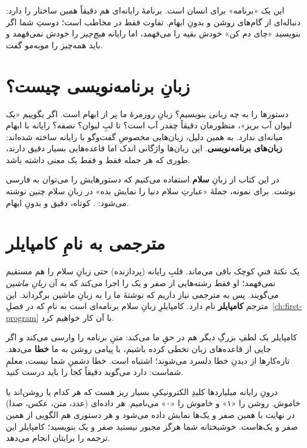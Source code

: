 این یک «برنامه» برای انسان است. برنامهٔ رایانه‌ای هم دقیقاً همین ساختار را
دارد: دنباله‌ای از گام‌های روشن و بدونِ ابهام. تفاوت فقط در مخاطب است؛
دوستِ شما اگر بنویسید «چای دم کن» خودش بقیه را می‌فهمد، اما رایانه
\emph{هیچ‌چیز} را خودش نمی‌فهمد و باید همه‌چیز را مو‌به‌مو گفت.

\section{زبانِ برنامه‌نویسی چیست؟}

دستورها را به چه زبانی بنویسیم؟ زبانِ روزمرهٔ ما پر از ابهام است. اگر بگوییم
«یک لیوان آب بریز»، منظورمان دقیقاً چقدر آب است؟ تا لبِ لیوان؟ نصفه؟ رایانه
با ابهام میانه‌ای ندارد. به همین دلیل، زبان‌هایی مخصوصِ گفت‌وگو با رایانه
ساخته شده‌اند: \textbf{زبان‌های برنامه‌نویسی}. این زبان‌ها واژگانی اندک اما
قاعده‌هایی بسیار دقیق دارند، طوری که هر جمله فقط و فقط یک معنی داشته باشد.

در این کتاب از زبانِ \textbf{سلام} استفاده می‌کنیم که دستورهایش را می‌توان به
فارسی نوشت. برای نمونه، جملهٔ «عبارتِ سلام دنیا را نمایش بده» در زبانِ سلام
چنین نوشته می‌شود: . کوتاه، دقیق و بدونِ ابهام.

\section{مترجمی به نامِ کامپایلر}

یک نکتهٔ فنیِ کوچک باقی می‌ماند. قلبِ رایانه (پردازنده) حتی زبانِ سلام را هم
مستقیم نمی‌فهمد؛ او فقط رشته‌هایی از صفر و یک را اجرا می‌کند که به آن
\emph{زبانِ ماشین} می‌گویند. پس به مترجمی نیاز داریم که نوشتهٔ ما را به زبانِ
ماشین برگرداند. این مترجم \textbf{کامپایلر} نام دارد. کامپایلرِ زبانِ سلام
برنامه‌ای است به نامِ  که در فصلِ~\ref{ch:first-program} با آن
کار خواهیم کرد.

کامپایلر یک لطفِ بزرگِ دیگر هم در حقِ ما می‌کند: متنِ برنامه را وارسی
می‌کند و اگر جایی از قاعده‌های زبان تخطی کرده باشیم، با پیامی روشن به ما
\textbf{خطا} می‌دهد. تازه‌کارها از دیدنِ خطا دلسرد می‌شوند؛ اشتباه است.
خطا دشمنِ شما نیست، معلمِ شماست: دارد می‌گوید دقیقاً کجا را باید درست کنید.

\begin{deep}
درونِ رایانه میلیاردها کلیدِ الکترونیکیِ بسیار ریز هست که هر کدام یا روشن‌اند
یا خاموش. روشن را «۱» و خاموش را «۰» می‌نامیم. هر داده‌ای (عدد، متن، عکس،
صدا) در نهایت با همین صفر و یک‌ها نمایش داده می‌شود و هر دستوری هم الگویی از
همین صفر و یک‌هاست. خوشبختانه شما هرگز مجبور نیستید صفر و یک بنویسید؛
کامپایلر این ترجمه را برایتان انجام می‌دهد.
\end{deep}

